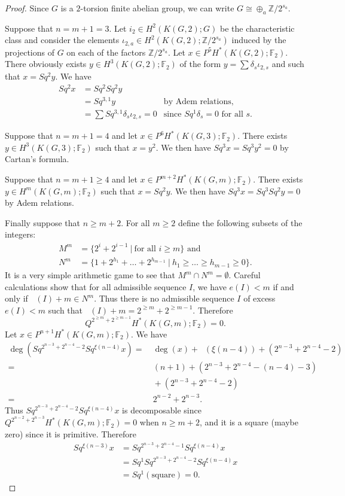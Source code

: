 \documentclass{amsart}
\theoremstyle{definition}
\theoremstyle{remark}
\DeclareMathOperator{\degst}{deg_{st}}
\newcommand{\Z}{\mathbb{Z}}
\newcommand{\F}{\mathbb{F}}
\renewcommand{\geq}{\geqslant}
\begin{document}
\newpage
\begin{proof}
Since $G$ is a $2$-torsion finite abelian group, we can write $G\cong\oplus_a\Z/2^{s_a}$. 

Suppose that $n=m+1=3$. Let $i_2\in H^2(K(G,2);G)$ be the characteristic class and consider the elements $\iota_{2,a}\in H^2(K(G,2);\Z/2^{s_a})$ induced by the projections of $G$ on each of the factors $\Z/2^{s_a}$. Let $x\in P^5H^*(K(G,2);\F_2)$. There obviously exists $y\in H^3(K(G,2);\F_2)$ of the form $y=\sum\delta_s\iota_{2,s}$ and such that $x=Sq^2y$. We have 
\begin{align*}
Sq^2 x &=Sq^2 Sq^2y\\
&=Sq^{3,1}y &\text{by Adem relations,}\\
&=\sum Sq^{3,1}\delta_s\iota_{2,s}=0 &\text{since $Sq^1\delta_s=0$ for all $s$.}
\end{align*}

Suppose that $n=m+1=4$ and let $x\in P^6H^*(K(G,3);\F_2)$. There exists $y\in H^3(K(G,3);\F_2)$ such that $x=y^2$. We then have $Sq^3x=Sq^3y^2=0$ by Cartan's formula.

Suppose that $n=m+1\geq4$ and let $x\in P^{m+2}H^*(K(G,m);\F_2)$. There exists $y\in H^m(K(G,m);\F_2)$ such that $x=Sq^2y$. We then have $Sq^3 x=Sq^3Sq^2y=0$ by Adem relations.

Finally suppose that $n\geq m+2$. For all $m\geq2$ define the following subsets of the integers:
\begin{align*}
M^m &=\{2^i+2^{i-1}\ |\ \text{for all $i\geq m$}\} \text{ and}\\
N^m &=\{1+2^{h_1}+\dots+2^{h_{m-1}}\ |\ h_1\geq\dots\geq h_{m-1}\geq0\}.
\end{align*}
It is a very simple arithmetic game to see that $M^m\cap N^m=\emptyset$. Careful calculations show that for all admissible sequence $I$, we have $e(I)<m$ if and only if $\degst(I)+m\in N^m$. Thus there is no admissible sequence $I$ of excess $e(I)<m$ such that $\degst(I)+m=2^{\geq m}+2^{\geq m-1}$. Therefore
$$
Q^{2^{\geq m}+2^{\geq m-1}}H^*(K(G,m);\F_2)=0.
$$
Let $x\in P^{n+1}H^*(K(G,m);\F_2)$. We have
\begin{align*}
\deg(Sq^{2^{n-3}+2^{n-4}-2}Sq^{\xi(n-4)}x) = &\ \deg(x) + \degst(\xi(n-4)) + (2^{n-3}+2^{n-4}-2)\\
= &\ (n+1) + (2^{n-3}+2^{n-4}-(n-4)-3)\\ 
&\ +(2^{n-3}+2^{n-4}-2)\\
= &\ 2^{n-2}+2^{n-3}.
\end{align*}
Thus $Sq^{2^{n-3}+2^{n-4}-2}Sq^{\xi(n-4)}x$ is decomposable since $Q^{2^{n-2}+2^{n-3}}H^*(K(G,m);\F_2)=0$ when $n\geq m+2$, and it is a square (maybe zero) since it is primitive. Therefore 
\begin{align*}
Sq^{\xi(n-3)}x &= Sq^{2^{n-3}+2^{n-4}-1}Sq^{\xi(n-4)}x\\
&=Sq^1Sq^{2^{n-3}+2^{n-4}-2}Sq^{\xi(n-4)}x\\
&=Sq^1(\text{square}) =0.
\end{align*}

\end{proof}
\end{document}
